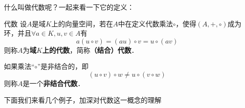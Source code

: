 

什么叫做代数呢？一起来看一下它的定义：
\begin{definition}{代数}
设$A$是域$K$上的向量空间，若在$A$中在定义代数乘法$\circ$，使得$(A,+,\circ)$成为环，并且$\forall a\in K, u, v\in A$有
\begin{equation}
a(u \circ v)=(a u) \circ v=u{\circ}(a v)
\end{equation}
则称$A$为\textbf{域$K$上的代数}，简称\textbf{（结合）代数}．

如果乘法“$\circ$”是非结合的，即
\begin{equation}
\left(u {\circ} v\right) \circ w \neq u{\circ}\left(v{\circ} w\right)
\end{equation}
则称$A$是一个\textbf{非结合代数}．
\end{definition}

下面我们来看几个例子，加深对代数这一概念的理解

